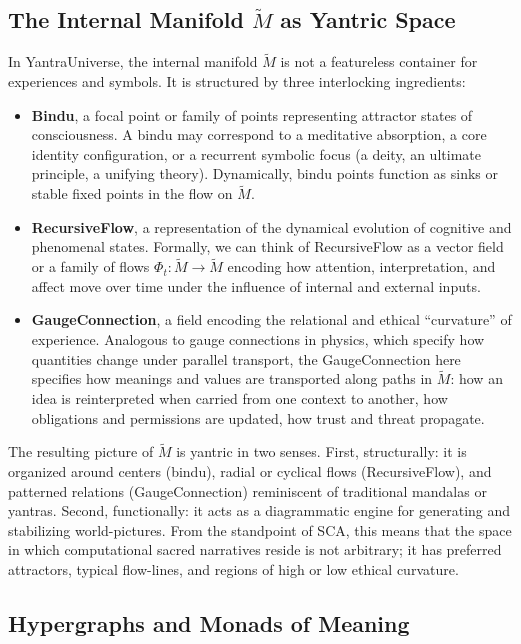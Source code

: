 \documentclass[12]{amsart}
\theoremstyle{plain}
\begin{document}
\subsection{The Internal Manifold $\tilde M$ as Yantric Space}

In YantraUniverse, the internal manifold $\tilde M$ is not a featureless container for experiences and symbols. It is structured by three interlocking ingredients:

\begin{itemize}
  \item \textbf{Bindu}, a focal point or family of points representing attractor states of consciousness. A bindu may correspond to a meditative absorption, a core identity configuration, or a recurrent symbolic focus (a deity, an ultimate principle, a unifying theory). Dynamically, bindu points function as sinks or stable fixed points in the flow on $\tilde M$.
  \item \textbf{RecursiveFlow}, a representation of the dynamical evolution of cognitive and phenomenal states. Formally, we can think of RecursiveFlow as a vector field or a family of flows $\Phi_t : \tilde M \to \tilde M$ encoding how attention, interpretation, and affect move over time under the influence of internal and external inputs.
  \item \textbf{GaugeConnection}, a field encoding the relational and ethical ``curvature'' of experience. Analogous to gauge connections in physics, which specify how quantities change under parallel transport, the GaugeConnection here specifies how meanings and values are transported along paths in $\tilde M$: how an idea is reinterpreted when carried from one context to another, how obligations and permissions are updated, how trust and threat propagate.
\end{itemize}

The resulting picture of $\tilde M$ is yantric in two senses. First, structurally: it is organized around centers (bindu), radial or cyclical flows (RecursiveFlow), and patterned relations (GaugeConnection) reminiscent of traditional mandalas or yantras. Second, functionally: it acts as a diagrammatic engine for generating and stabilizing world-pictures. From the standpoint of SCA, this means that the space in which computational sacred narratives reside is not arbitrary; it has preferred attractors, typical flow-lines, and regions of high or low ethical curvature.

\subsection{Hypergraphs and Monads of Meaning}
\end{document}
